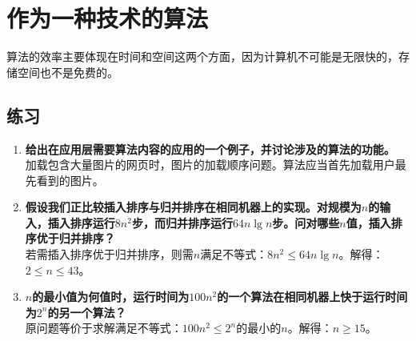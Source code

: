 \documentclass[UTF8,a4paper,zihao=-4,oneside,onecolumn,scheme=chinese,autoindent=true]{ctexbook}
\begin{document}
\section{作为一种技术的算法}
算法的效率主要体现在时间和空间这两个方面，因为计算机不可能是无限快的，存储空间也不是免费的。

\subsection*{练习}
\begin{enumerate}
    \renewcommand{\labelenumi}{\thesection-\theenumi}
    \item {\textbf{给出在应用层需要算法内容的应用的一个例子，并讨论涉及的算法的功能。}\\加载包含大量图片的网页时，图片的加载顺序问题。算法应当首先加载用户最先看到的图片。}
    \item {\textbf{假设我们正比较插入排序与归并排序在相同机器上的实现。对规模为$n$的输入，插入排序运行$8n^2$步，而归并排序运行$64n\lg{n}$步。问对哪些$n$值，插入排序优于归并排序？}\\若需插入排序优于归并排序，则需$n$满足不等式：$8n^2 \le 64n\lg{n}$。解得：$2 \leq n \leq 43$。}
    \item {\textbf{$n$的最小值为何值时，运行时间为$100n^2$的一个算法在相同机器上快于运行时间为$2^n$的另一个算法？}\\原问题等价于求解满足不等式：$100n^2 \le 2^n$的最小的$n$。解得：$n \geq 15$。}
\end{enumerate}


\end{document}
